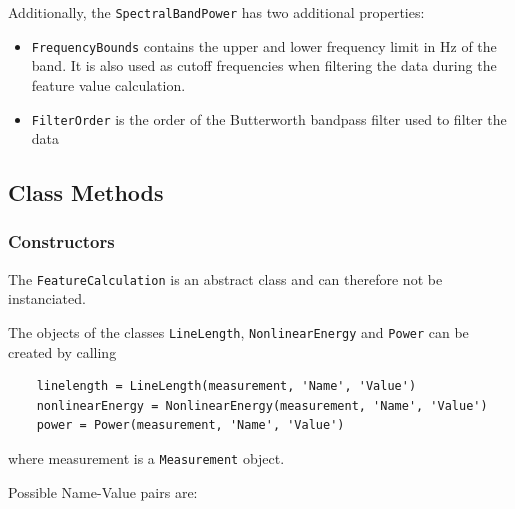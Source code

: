\documentclass[usletter, 11pt]{extarticle}
\begin{document}
Additionally, the \verb|SpectralBandPower| has two additional properties:
\begin{itemize}
	\item \verb|FrequencyBounds| contains the upper and lower frequency limit in Hz of the band. It is also used as cutoff frequencies when filtering the data during the feature value calculation. 
	\item \verb|FilterOrder| is the order of the Butterworth bandpass filter used to filter the data
\end{itemize}

\subsection{Class Methods}

\subsubsection{Constructors}

The \verb|FeatureCalculation| is an abstract class and can therefore not be instanciated. 

The objects of the classes \verb|LineLength|, \verb|NonlinearEnergy| and \verb|Power| can be created by calling
\begin{Verbatim}
	linelength = LineLength(measurement, 'Name', 'Value')
	nonlinearEnergy = NonlinearEnergy(measurement, 'Name', 'Value')
	power = Power(measurement, 'Name', 'Value')
\end{Verbatim}
where measurement is a \verb|Measurement| object.

\newpage
Possible Name-Value pairs are: 
\end{document}
